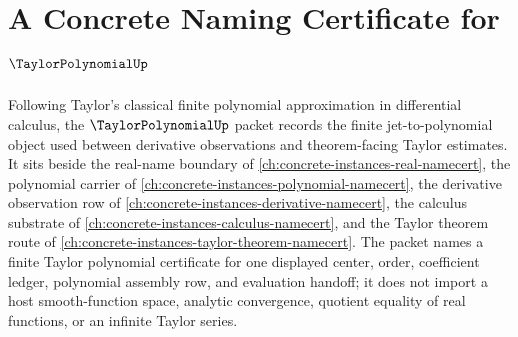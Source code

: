 \chapter{A Concrete Naming Certificate for $\TaylorPolynomialUp$}
\label{ch:concrete-instances-taylor-polynomial-namecert}

Following Taylor's classical finite polynomial approximation in differential calculus, the $\TaylorPolynomialUp$ packet records the finite jet-to-polynomial object used between derivative observations and theorem-facing Taylor estimates. It sits beside the real-name boundary of \autoref{ch:concrete-instances-real-namecert}, the polynomial carrier of \autoref{ch:concrete-instances-polynomial-namecert}, the derivative observation row of \autoref{ch:concrete-instances-derivative-namecert}, the calculus substrate of \autoref{ch:concrete-instances-calculus-namecert}, and the Taylor theorem route of \autoref{ch:concrete-instances-taylor-theorem-namecert}. The packet names a finite Taylor polynomial certificate for one displayed center, order, coefficient ledger, polynomial assembly row, and evaluation handoff; it does not import a host smooth-function space, analytic convergence, quotient equality of real functions, or an infinite Taylor series.

